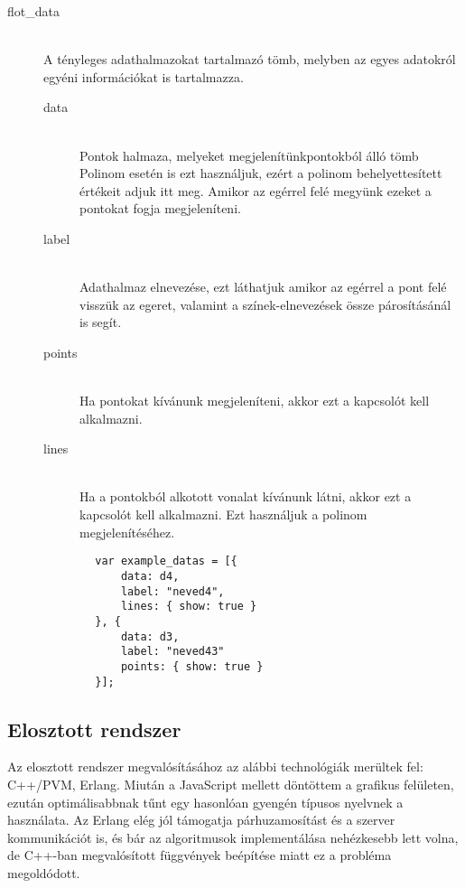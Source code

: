 \begin{description}
	 		\item[flot\_data] \hfill \\ 
	 		A tényleges adathalmazokat tartalmazó tömb, melyben az egyes adatokról egyéni információkat is tartalmazza.\newline
	 		\begin{description}
				\item[data] \hfill \\ 
				Pontok halmaza, melyeket megjelenítünk\newline
				[x, y] pontokból álló tömb\newline
				Polinom esetén is ezt használjuk, ezért a polinom behelyettesített értékeit adjuk itt meg. Amikor az egérrel felé megyünk ezeket a pontokat fogja megjeleníteni.
				\item[label] \hfill \\ 
				Adathalmaz elnevezése, ezt láthatjuk amikor az egérrel a pont felé visszük az egeret, valamint a színek-elnevezések össze párosításánál is segít.
				\item[points] \hfill \\ 
				Ha pontokat kívánunk megjeleníteni, akkor ezt a kapcsolót kell alkalmazni.
				\item[lines] \hfill \\ 
				Ha a pontokból alkotott vonalat kívánunk látni, akkor ezt a kapcsolót kell alkalmazni. Ezt használjuk a polinom megjelenítéséhez.
			\end{description}
	 		\begin{verbatim}
		var example_datas = [{
			data: d4,
			label: "neved4",
			lines: { show: true }
		}, {
		    data: d3,
			label: "neved43"
		    points: { show: true }
		}];
			\end{verbatim}
		\end{description}

\subsection{Elosztott rendszer}
	Az elosztott rendszer megvalósításához az alábbi technológiák merültek fel: C++/PVM, Erlang.
	Miután a JavaScript mellett döntöttem a grafikus felületen, ezután optimálisabbnak tűnt egy hasonlóan gyengén típusos nyelvnek a használata. Az Erlang elég jól támogatja párhuzamosítást és a szerver kommunikációt is, és bár az algoritmusok implementálása nehézkesebb lett volna, de C++-ban megvalósított függvények beépítése miatt ez a probléma megoldódott.

